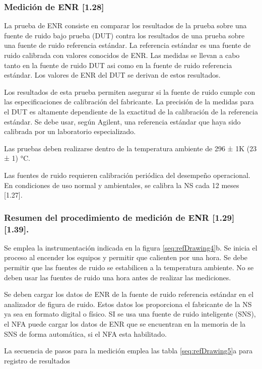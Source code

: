 \subsubsection{Medición de ENR [1.28]}
La prueba de ENR consiste en comparar los resultados de la prueba sobre una fuente de ruido bajo prueba (DUT) contra los	resultados de una prueba sobre una fuente de ruido referencia estándar. La referencia estándar es una fuente de ruido calibrada con valores conocidos de ENR. Las medidas se llevan a cabo tanto en la fuente de ruido DUT asi como en la fuente de ruido referencia estándar. Los valores de ENR del DUT se derivan de estos resultados. 

Los resultados de esta prueba permiten asegurar si la fuente de ruido cumple con las especificaciones de calibración del fabricante. La precisión de la medidas para el DUT es altamente dependiente de la exactitud de la calibración de la referencia estándar. Se debe usar, según Agilent, una referencia estándar que haya sido calibrada por un laboratorio especializado.

Las pruebas deben realizarse dentro de la temperatura ambiente de 296 ± 1K (23 ± 1) °C.

Las fuentes de ruido requieren calibración periódica del desempeño operacional. En condiciones de uso normal y ambientales, se calibra la NS cada 12 meses [1.27].

\subsubsection{Resumen del procedimiento de medición de ENR [1.29] [1.39].}
Se emplea la instrumentación indicada en la figura \ref{seq:refDrawing4}b. Se inicia el proceso al encender los equipos y permitir que calienten por una hora. Se debe permitir que las fuentes de ruido se estabilicen a la temperatura	ambiente. No se deben usar las fuentes de ruido una hora antes de realizar las mediciones.
	
Se deben cargar los datos de ENR de la fuente de ruido referencia estándar en el analizador de figura de ruido. Estos datos los proporciona el fabricante de la NS ya sea en formato digital o físico. SI se usa una fuente de ruido inteligente (SNS), el NFA puede cargar los datos de ENR que se encuentran en la memoria de la SNS de forma automática, si el NFA esta habilitado.

La secuencia de pasos para la medición emplea las tabla \ref{seq:refDrawing5}a para registro de resultados


